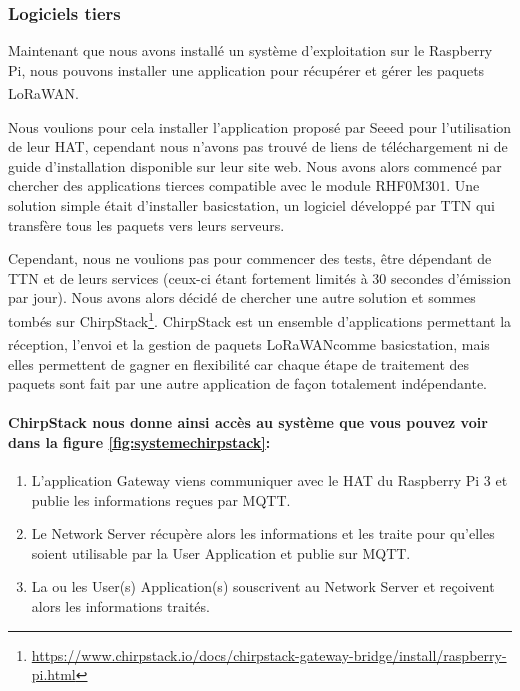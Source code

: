 \documentclass{article}
\begin{document}
			\subsubsection{Logiciels tiers}
				Maintenant que nous avons installé un système d'exploitation sur le Raspberry Pi, nous pouvons installer une application pour récupérer et gérer les paquets LoRaWAN\textsuperscript\textregistered.
				
				Nous voulions pour cela installer l'application proposé par Seeed pour l'utilisation de leur HAT, cependant nous n'avons pas trouvé de liens de téléchargement ni de guide d'installation disponible sur leur site web. 
				Nous avons alors commencé par chercher des applications tierces compatible avec le module RHF0M301. Une solution simple était d'installer basicstation, un logiciel développé par TTN qui transfère tous les paquets vers leurs serveurs.
				
				Cependant, nous ne voulions pas pour commencer des tests, être dépendant de TTN et de leurs services (ceux-ci étant fortement limités à 30 secondes d'émission par jour).
				Nous avons alors décidé de chercher une autre solution et sommes tombés sur ChirpStack\footnote{\url{https://www.chirpstack.io/docs/chirpstack-gateway-bridge/install/raspberry-pi.html}}. ChirpStack est un ensemble d'applications permettant la réception, l'envoi et la gestion de paquets LoRaWAN\textsuperscript\textregistered comme basicstation, mais elles permettent de gagner en flexibilité car chaque étape de traitement des paquets sont fait par une autre application de façon totalement indépendante.
				
				\paragraph{ChirpStack nous donne ainsi accès au système que vous pouvez voir dans la figure \ref{fig:systemechirpstack}:}
				\begin{enumerate}
					\item L'application Gateway viens communiquer avec le HAT du Raspberry Pi 3 et publie les informations reçues par MQTT.
					\item Le Network Server récupère alors les informations et les traite pour qu'elles soient utilisable par la User Application et publie sur MQTT.
					\item La ou les User(s) Application(s) souscrivent au Network Server et reçoivent alors les informations traités.
				\end{enumerate}
\end{document}
